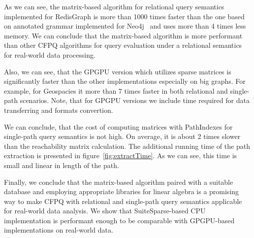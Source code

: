 As we can see, the matrix-based algorithm for relational query semantics implemented for RedisGraph is more than 1000 times faster than the one based on annotated grammar implemented for Neo4j~\cite{Kuijpers:2019:ESC:3335783.3335791} and uses more than 4 times less memory.
We can conclude that the matrix-based algorithm is more performant than other CFPQ algorithms for query evaluation under a relational semantics for real-world data processing.

Also, we can see, that the GPGPU version which utilizes sparse matrices is significantly faster than the other implementations especially on big graphs. For example, for Geospacies it more than 7 times faster in both relational and single-path scenarios.
Note, that for GPGPU versions we include time required for data transferring and formats convertion.

We can conclude, that the cost of computing matrices with PathIndexes for single-path query semantics is not high. On average, it is about 2 times slower than the reachability matrix calculation. The additional running time of the path extraction is presented in figure~\ref{fig:extractTime}. As we can see, this time is small and linear in length of the path.

Finally, we conclude that the matrix-based algorithm paired with a suitable database and employing appropriate libraries for linear algebra is a promising way to make CFPQ with relational and single-path query semantics applicable for real-world data analysis.
We show that SuiteSparse-based CPU implementation is performant enough to be comparable with GPGPU-based implementations on real-world data.



